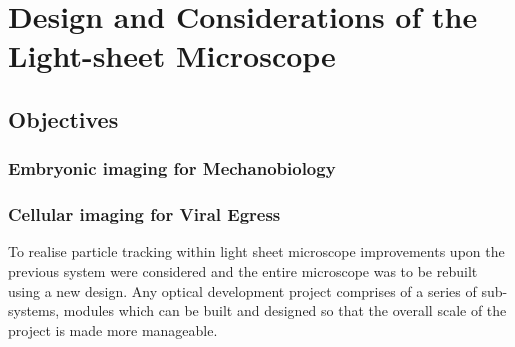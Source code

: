 

\ifpdf
    \graphicspath{{Chapters/design/Figs/Raster/}{Chapters/design/Figs/PDF/}{Chapters/design/Figs/}}
\else
    \graphicspath{{Chapters/design/Figs/Vector/}{Chapters/design/Figs/}}
\fi



\chapter{Design and Considerations of the Light-sheet Microscope}
\section{Objectives}
\subsection{Embryonic imaging for Mechanobiology}
\subsection{Cellular imaging for Viral Egress}

To realise particle tracking within light sheet microscope improvements upon the previous system were considered and the entire microscope was to be rebuilt using a new design.
Any optical development project comprises of a series of sub-systems, modules which can be built and designed so that the overall scale of the project is made more manageable.
%
%

